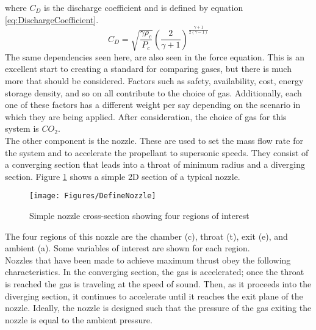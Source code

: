 where $C_D$ is the discharge coefficient and is defined by equation \ref{eq:DischargeCoefficient}.
\begin{equation}\label{eq:DischargeCoefficient}
C_D=\sqrt{\frac{\gamma \rho_c}{P_c}}\left(\frac{2}{\gamma+1}\right)^{\frac{\gamma+1}{2(\gamma-1)}}
\end{equation}
The same dependencies seen here, are also seen in the force equation.%
%
%
%
%
%
%
%
%
%
This is an excellent start to creating a standard for comparing gases, but there is much more that should be considered. Factors such as safety, availability, cost, energy storage density, and so on all contribute to the choice of gas. Additionally, each one of these factors has a different weight per say depending on the scenario in which they are being applied. After consideration, the choice of gas for this system is $CO_2$.\\
The other component is the nozzle. These are used to set the mass flow rate for the system and to accelerate the propellant to supersonic speeds. They consist of a converging section that leads into a throat of minimum radius and a diverging section. Figure \ref{fig:Nozzle} shows a simple 2D section of a typical nozzle. 
\begin{figure}[h!]
\centering
\texttt{[image: Figures/DefineNozzle]}
\caption{Simple nozzle cross-section showing four regions of interest}
\label{fig:Nozzle}
\end{figure}
The four regions of this nozzle are the chamber (c), throat (t), exit (e), and ambient (a). Some variables of interest are shown for each region.\\
Nozzles that have been made to achieve maximum thrust obey the following characteristics. In the converging section, the gas is accelerated; once the throat is reached the gas is traveling at the speed of sound. Then, as it proceeds into the diverging section, it continues to accelerate until it reaches the exit plane of the nozzle. Ideally, the nozzle is designed such that the pressure of the gas exiting the nozzle is equal to the ambient pressure. \\
